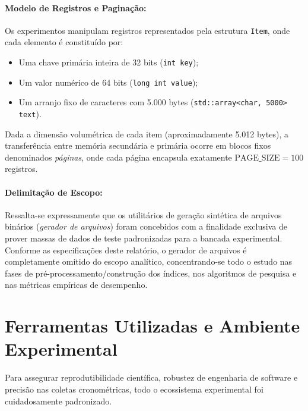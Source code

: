 \documentclass[12pt,a4paper]{article}
\begin{document}
\paragraph{Modelo de Registros e Paginação:}
Os experimentos manipulam registros representados pela estrutura \texttt{Item}, onde cada elemento é constituído por:
\begin{itemize}
    \item Uma chave primária inteira de 32 bits (\texttt{int key});
    \item Um valor numérico de 64 bits (\texttt{long int value});
    \item Um arranjo fixo de caracteres com 5.000 bytes (\texttt{std::array<char, 5000> text}).
\end{itemize}
Dada a dimensão volumétrica de cada item (aproximadamente 5.012 bytes), a transferência entre memória secundária e primária ocorre em blocos fixos denominados \textit{páginas}, onde cada página encapsula exatamente $\text{PAGE\_SIZE} = 100$ registros.

\paragraph{Delimitação de Escopo:}
Ressalta-se expressamente que os utilitários de geração sintética de arquivos binários (\textit{gerador de arquivos}) foram concebidos com a finalidade exclusiva de prover massas de dados de teste padronizadas para a bancada experimental. Conforme as especificações deste relatório, o gerador de arquivos é completamente omitido do escopo analítico, concentrando-se todo o estudo nas fases de pré-processamento/construção dos índices, nos algoritmos de pesquisa e nas métricas empíricas de desempenho.

\section{Ferramentas Utilizadas e Ambiente Experimental}
\label{sec:ferramentas}

Para assegurar reprodutibilidade científica, robustez de engenharia de software e precisão nas coletas cronométricas, todo o ecossistema experimental foi cuidadosamente padronizado.
\end{document}
